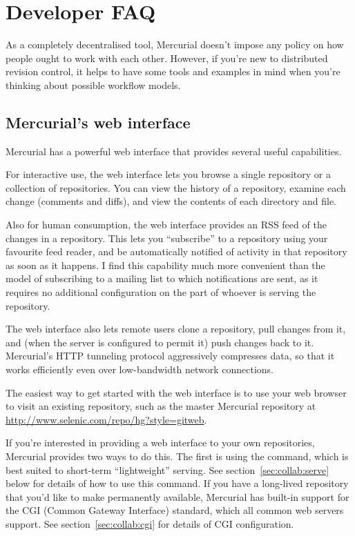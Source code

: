 \chapter{Developer FAQ}
\label{cha:developerfaq}

As a completely decentralised tool, Mercurial doesn't impose any
policy on how people ought to work with each other.  However, if
you're new to distributed revision control, it helps to have some
tools and examples in mind when you're thinking about possible
workflow models.

\section{Mercurial's web interface}

Mercurial has a powerful web interface that provides several 
useful capabilities.

For interactive use, the web interface lets you browse a single
repository or a collection of repositories.  You can view the history
of a repository, examine each change (comments and diffs), and view
the contents of each directory and file.

Also for human consumption, the web interface provides an RSS feed of
the changes in a repository.  This lets you ``subscribe'' to a
repository using your favourite feed reader, and be automatically
notified of activity in that repository as soon as it happens.  I find
this capability much more convenient than the model of subscribing to
a mailing list to which notifications are sent, as it requires no
additional configuration on the part of whoever is serving the
repository.

The web interface also lets remote users clone a repository, pull
changes from it, and (when the server is configured to permit it) push
changes back to it.  Mercurial's HTTP tunneling protocol aggressively
compresses data, so that it works efficiently even over low-bandwidth
network connections.

The easiest way to get started with the web interface is to use your
web browser to visit an existing repository, such as the master
Mercurial repository at
\url{http://www.selenic.com/repo/hg?style=gitweb}.

If you're interested in providing a web interface to your own
repositories, Mercurial provides two ways to do this.  The first is
using the  command, which is best suited to short-term
``lightweight'' serving.  See section~\ref{sec:collab:serve} below for
details of how to use this command.  If you have a long-lived
repository that you'd like to make permanently available, Mercurial
has built-in support for the CGI (Common Gateway Interface) standard,
which all common web servers support.  See
section~\ref{sec:collab:cgi} for details of CGI configuration.

